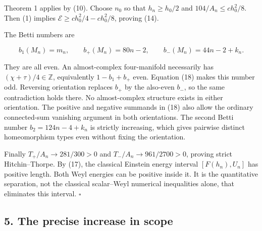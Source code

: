 \documentclass[
  10pt,
]{article}
\begin{document}
Theorem 1 applies by (10). Choose \(n_0\) so that \(h_n\ge h_0/2\) and
\(104/A_n\le c h_0^2/8\). Then (1) implies
\(\mathcal E\ge ch_0^2/4-ch_0^2/8\), proving (14).

The Betti numbers are

\[
 b_1(M_n)=m_n,\qquad b_+(M_n)=80n-2,\qquad
 b_-(M_n)=44n-2+k_n.
 \tag{18}
\]

They are all even. An almost-complex four-manifold necessarily has
\((\chi+\tau)/4\in\mathbb Z\), equivalently \(1-b_1+b_+\) even. Equation
(18) makes this number odd. Reversing orientation replaces \(b_+\) by
the also-even \(b_-\), so the same contradiction holds there. No
almost-complex structure exists in either orientation. The positive and
negative summands in (18) also allow the ordinary connected-sum
vanishing argument in both orientations. The second Betti number
\(b_2=124n-4+k_n\) is strictly increasing, which gives pairwise distinct
homeomorphism types even without fixing the orientation.

Finally \(T_+/A_n\to281/300>0\) and \(T_-/A_n\to961/2700>0\), proving
strict Hitchin--Thorpe. By (17), the classical Einstein energy interval
\([F(h_n),U_n]\) has positive length. Both Weyl energies can be positive
inside it. It is the quantitative separation, not the classical
scalar--Weyl numerical inequalities alone, that eliminates this
interval. \(\square\)

\hypertarget{the-precise-increase-in-scope}{%
\subsection{5. The precise increase in
scope}\label{the-precise-increase-in-scope}}
\end{document}
